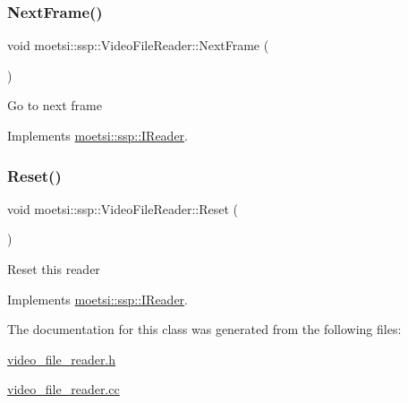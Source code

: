 \subsubsection{\texorpdfstring{Next\+Frame()}{NextFrame()}}
{\footnotesize\ttfamily void moetsi\+::ssp\+::\+Video\+File\+Reader\+::\+Next\+Frame (\begin{DoxyParamCaption}{ }\end{DoxyParamCaption})\hspace{0.3cm}{\ttfamily [virtual]}}

Go to next frame 

Implements \hyperlink{classmoetsi_1_1ssp_1_1IReader_a49e82a786cca55248e27e7fac8f97a17}{moetsi\+::ssp\+::\+I\+Reader}.

\mbox{\label{classmoetsi_1_1ssp_1_1VideoFileReader_ac646d10b57d4e3b3ff4d1c83a47e8c3d}} 
\subsubsection{\texorpdfstring{Reset()}{Reset()}}
{\footnotesize\ttfamily void moetsi\+::ssp\+::\+Video\+File\+Reader\+::\+Reset (\begin{DoxyParamCaption}{ }\end{DoxyParamCaption})\hspace{0.3cm}{\ttfamily [virtual]}}

Reset this reader 

Implements \hyperlink{classmoetsi_1_1ssp_1_1IReader_ad6e2ef78fc2466884aa877ecef54889d}{moetsi\+::ssp\+::\+I\+Reader}.



The documentation for this class was generated from the following files\+:\begin{DoxyCompactItemize}
\item 
\hyperlink{video__file__reader_8h}{video\+\_\+file\+\_\+reader.\+h}\item 
\hyperlink{video__file__reader_8cc}{video\+\_\+file\+\_\+reader.\+cc}\end{DoxyCompactItemize}
